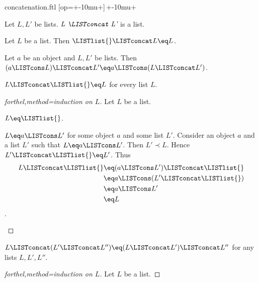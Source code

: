 \documentclass{naproche-library}
\begin{document}
\begin{smodule}[title=Concatenation]{concatenation.ftl}
[op=+\mkern-10mu+]{\,\comp+\mkern-10mu\comp+\,}

\begin{signature}[forthel,id=LISTS_CONCAT_4578620297183232]
  Let $L, L'$ be lists.
  $\emph{L \LISTconcat L'}$ is a list.
\end{signature}

\begin{axiom}[forthel,id=LISTS_CONCAT_3703161885818880]
  Let $L$ be a list.
  Then $\LISTlist{} \LISTconcat L \eq L$.
\end{axiom}

\begin{axiom}[forthel,id=LISTS_CONCAT_8050301789536256]
  Let $a$ be an object and $L, L'$ be lists.
  Then $(a \LISTcons L) \LISTconcat L' \eq a \LISTcons (L \LISTconcat L')$.
\end{axiom}

\begin{proposition}[forthel,id=LISTS_CONCAT_4512036658964875]
  $L \LISTconcat \LISTlist{} \eq L$ for every list $L$.
\end{proposition}
\begin{proof}[forthel,method=induction on $L$]
  Let $L$ be a list.

  \begin{case}{$L \eq \LISTlist{}$.} \end{case}
  
  \begin{case}{$L \eq a \LISTcons L'$ for some object $a$ and some list $L'$.}
    Consider an object $a$ and a list $L'$ such that $L \eq a \LISTcons L'$.
    Then $L' \prec L$.
    Hence $L' \LISTconcat \LISTlist{} \eq L'$.
    Thus
    \begin{align*}
      L \LISTconcat \LISTlist{}
        &\eq (a \LISTcons L') \LISTconcat \LISTlist{}\\
        &\eq a \LISTcons (L' \LISTconcat \LISTlist{})\\
        &\eq a \LISTcons L'\\
        &\eq L
    \end{align*}.
  \end{case}
\end{proof}

\begin{proposition}[forthel,id=LISTS_CONCAT_1021563255448756]
  $L \LISTconcat (L' \LISTconcat L'') \eq (L \LISTconcat L') \LISTconcat L''$ for any lists $L, L', L''$.
\end{proposition}
\begin{proof}[forthel,method=induction on $L$]
  Let $L$ be a list.


\end{proof}
\end{smodule}
\end{document}
